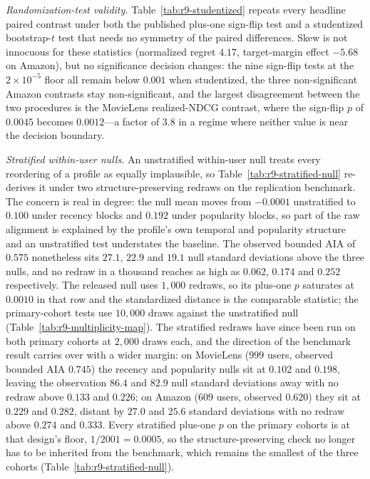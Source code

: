 \documentclass[manuscript,screen,anonymous]{acmart}
\begin{document}
\emph{Randomization-test validity.}
Table~\ref{tab:r9-studentized} repeats every headline paired contrast under both
the published plus-one sign-flip test and a studentized bootstrap-$t$ test that
needs no symmetry of the paired differences. Skew is not innocuous for these
statistics (normalized regret $4.17$, target-margin effect $-5.68$ on Amazon), but
no significance decision changes: the nine sign-flip tests at the
$2{\times}10^{-5}$ floor all remain below $0.001$ when studentized, the three
non-significant Amazon contrasts stay non-significant, and the largest disagreement
between the two procedures is the MovieLens realized-NDCG contrast, where the
sign-flip $p$ of $0.0045$ becomes $0.0012$---a factor of $3.8$ in a regime where
neither value is near the decision boundary.

\emph{Stratified within-user nulls.} An unstratified within-user null
treats every reordering of a profile as equally implausible, so
Table~\ref{tab:r9-stratified-null} re-derives it under two structure-preserving
redraws on the replication benchmark. The concern is real in degree: the
null mean moves from $-0.0001$ unstratified to $0.100$ under recency blocks and
$0.192$ under popularity blocks, so part of the raw alignment is explained by the
profile's own temporal and popularity structure and an unstratified test understates
the baseline. The observed bounded AIA of $0.575$ nonetheless sits $27.1$, $22.9$
and $19.1$ null standard deviations above the three nulls, and no redraw in a
thousand reaches as high as $0.062$, $0.174$ and $0.252$ respectively. The released
null uses $1{,}000$ redraws, so its plus-one $p$ saturates at $0.0010$ in that row and
the standardized distance is the comparable statistic; the primary-cohort tests use
$10{,}000$ draws against the unstratified null (Table~\ref{tab:r9-multiplicity-map}).
The stratified redraws have since been run on both primary cohorts at $2{,}000$ draws
each, and the direction of the benchmark result carries over with a wider margin: on
MovieLens ($999$ users, observed bounded AIA $0.745$) the recency and popularity nulls
sit at $0.102$ and $0.198$, leaving the observation $86.4$ and $82.9$ null standard
deviations away with no redraw above $0.133$ and $0.226$; on Amazon ($609$ users,
observed $0.620$) they sit at $0.229$ and $0.282$, distant by $27.0$ and $25.6$
standard deviations with no redraw above $0.274$ and $0.333$. Every stratified plus-one
$p$ on the primary cohorts is at that design's floor, $1/2001 = 0.0005$, so the
structure-preserving check no longer has to be inherited from the benchmark, which
remains the smallest of the three cohorts (Table~\ref{tab:r9-stratified-null}).
\end{document}
